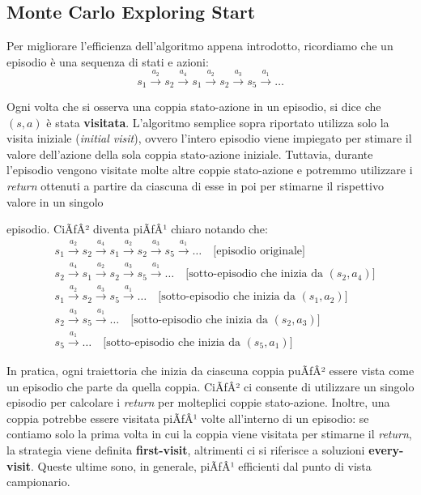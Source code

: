 ﻿\documentclass[11pt, a4paper]{report}
\begin{document}
\subsection{Monte Carlo Exploring Start}

Per migliorare l'efficienza dell'algoritmo appena introdotto, ricordiamo che un episodio è una sequenza di stati e azioni:
\begin{equation}
s_1 \xrightarrow{a_2} s_2 \xrightarrow{a_4} s_1 \xrightarrow{a_2} s_2 \xrightarrow{a_3} s_5 \xrightarrow{a_1} \dots
\end{equation}

Ogni volta che si osserva una coppia stato-azione in un episodio, si dice che $(s, a)$ è stata \textbf{visitata}. L'algoritmo semplice sopra riportato utilizza solo la visita iniziale (\emph{initial visit}), ovvero l'intero episodio viene impiegato per stimare il valore dell'azione della sola coppia stato-azione iniziale. Tuttavia, durante l'episodio vengono visitate molte altre coppie stato-azione e potremmo utilizzare i \emph{return} ottenuti a partire da ciascuna di esse in poi per stimarne il rispettivo valore in un singolo

\newpage

episodio. CiÃƒÂ² diventa piÃƒÂ¹ chiaro notando che:
\begin{align*}
&s_1 \xrightarrow{a_2} s_2 \xrightarrow{a_4} s_1 \xrightarrow{a_2} s_2 \xrightarrow{a_3} s_5 \xrightarrow{a_1} \dots \quad \text{[episodio originale]} \\
&s_2 \xrightarrow{a_4} s_1 \xrightarrow{a_2} s_2 \xrightarrow{a_3} s_5 \xrightarrow{a_1} \dots \quad \text{[sotto-episodio che inizia da } (s_2, a_4)\text{]} \\
&s_1 \xrightarrow{a_2} s_2 \xrightarrow{a_3} s_5 \xrightarrow{a_1} \dots \quad \text{[sotto-episodio che inizia da } (s_1, a_2)\text{]} \\
&s_2 \xrightarrow{a_3} s_5 \xrightarrow{a_1} \dots \quad \text{[sotto-episodio che inizia da } (s_2, a_3)\text{]} \\
&s_5 \xrightarrow{a_1} \dots \quad \text{[sotto-episodio che inizia da } (s_5, a_1)\text{]}
\end{align*}

In pratica, ogni traiettoria che inizia da ciascuna coppia puÃƒÂ² essere vista come un episodio che parte da quella coppia. CiÃƒÂ² ci consente di utilizzare un singolo episodio per calcolare i \emph{return} per molteplici coppie stato-azione. Inoltre, una coppia potrebbe essere visitata piÃƒÂ¹ volte all'interno di un episodio: se contiamo solo la prima volta in cui la coppia viene visitata per stimarne il \emph{return}, la strategia viene definita \textbf{first-visit}, altrimenti ci si riferisce a soluzioni \textbf{every-visit}. Queste ultime sono, in generale, piÃƒÂ¹ efficienti dal punto di vista campionario.
\end{document}
